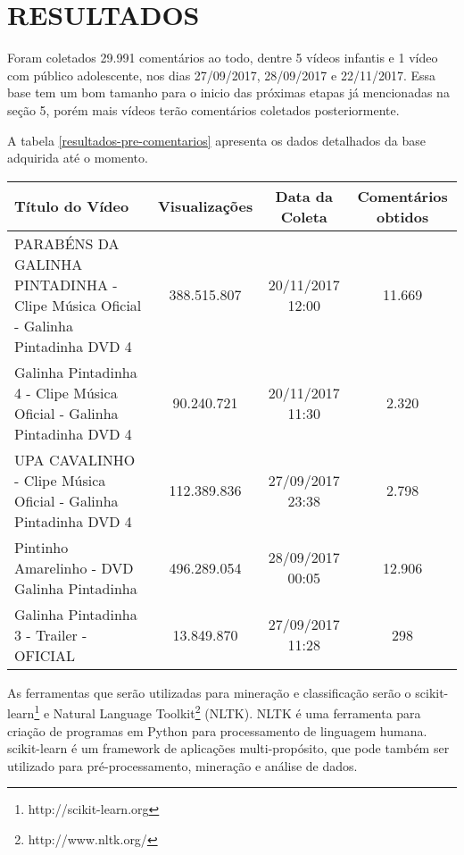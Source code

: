 \section{RESULTADOS}

Foram coletados 29.991 comentários ao todo, dentre 5 vídeos infantis e 1 vídeo com público adolescente, nos dias 27/09/2017, 28/09/2017 e 22/11/2017. Essa base tem um bom tamanho para o inicio das próximas etapas já mencionadas na seção 5, porém mais vídeos terão comentários coletados posteriormente.

A tabela \ref{resultados-pre-comentarios} apresenta os dados detalhados da base adquirida até o momento.


\begin{table}[H]
	
\begin{tabular}{|p{5.5=[cm}|c|c|c|}
\hline
\textbf{Título do Vídeo} & \textbf{Visualizações} & \textbf{Data da Coleta} & \textbf{Comentários obtidos} \\ \hline
PARABÉNS DA GALINHA PINTADINHA - Clipe Música Oficial - Galinha Pintadinha DVD 4 & 388.515.807 & 20/11/2017 12:00 & 11.669 \\ \hline
Galinha Pintadinha 4 - Clipe Música Oficial - Galinha Pintadinha DVD 4 & 90.240.721 & 20/11/2017 11:30 & 2.320 \\ \hline
UPA CAVALINHO - Clipe Música Oficial - Galinha Pintadinha DVD 4 & 112.389.836 & 27/09/2017 23:38 & 2.798 \\ \hline
Pintinho Amarelinho - DVD Galinha Pintadinha & 496.289.054 & 28/09/2017 00:05 & 12.906 \\ \hline
Galinha Pintadinha 3 - Trailer - OFICIAL & 13.849.870 & 27/09/2017 11:28 & 298 \\ \hline
\end{tabular}

\end{table}


As ferramentas que serão utilizadas para mineração e classificação serão o scikit-learn\footnote{http://scikit-learn.org} e Natural Language Toolkit\footnote{http://www.nltk.org/} (NLTK). NLTK é uma ferramenta para criação de programas em Python para processamento de linguagem humana. scikit-learn é um framework de aplicações multi-propósito, que pode também ser utilizado para pré-processamento, mineração e análise de dados. 

